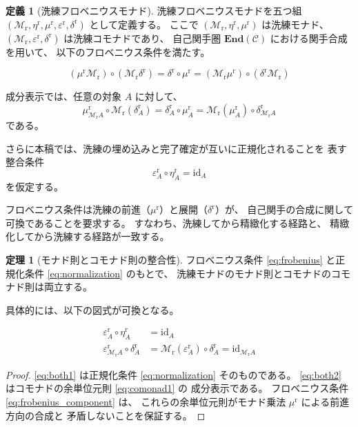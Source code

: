 \documentclass[11pt,a4paper]{article}
\theoremstyle{definition}
\newtheorem{definition}{定義}[section]
\newtheorem{theorem}{定理}[section]
\newcommand{\Mr}{\mathcal{M}_{\mathrm{r}}}
\newcommand{\etar}{\eta^{\mathrm{r}}}
\newcommand{\mur}{\mu^{\mathrm{r}}}
\newcommand{\epsr}{\varepsilon^{\mathrm{r}}}
\newcommand{\deltar}{\delta^{\mathrm{r}}}
\newcommand{\id}{\mathrm{id}}
\newcommand{\End}{\mathbf{End}}
\begin{document}
\begin{definition}[洗練フロベニウスモナド]
洗練フロベニウスモナドを五つ組
$(\Mr, \etar, \mur, \epsr, \deltar)$
として定義する。
ここで $(\Mr, \etar, \mur)$ は洗練モナド、
$(\Mr, \epsr, \deltar)$ は洗練コモナドであり、
自己関手圏 $\End(\mathcal{C})$ における関手合成を用いて、
以下のフロベニウス条件を満たす。

\begin{equation}
(\mur\Mr) \circ (\Mr\deltar)
= \deltar \circ \mur
= (\Mr\mur) \circ (\deltar\Mr)
\label{eq:frobenius}
\end{equation}

成分表示では、任意の対象 $A$ に対して、
\begin{equation}
\mur_{\Mr A} \circ \Mr(\deltar_A)
= \deltar_A \circ \mur_A
= \Mr(\mur_A) \circ \deltar_{\Mr A}
\label{eq:frobenius_component}
\end{equation}
である。

さらに本稿では、洗練の埋め込みと完了確定が互いに正規化されることを
表す整合条件
\begin{equation}
\epsr_A \circ \etar_A = \id_A
\label{eq:normalization}
\end{equation}
を仮定する。

フロベニウス条件は洗練の前進（$\mur$）と展開（$\deltar$）が、
自己関手の合成に関して
可換であることを要求する。
すなわち、洗練してから精緻化する経路と、
精緻化してから洗練する経路が一致する。
\end{definition}

\begin{theorem}[モナド則とコモナド則の整合性]
フロベニウス条件 \eqref{eq:frobenius} と正規化条件
\eqref{eq:normalization} のもとで、
洗練モナドのモナド則とコモナドのコモナド則は両立する。

具体的には、以下の図式が可換となる。

\begin{align}
\epsr_A \circ \etar_A &= \id_A \label{eq:both1}\\
\epsr_{\Mr A} \circ \deltar_A
&= \Mr(\epsr_A) \circ \deltar_A
= \id_{\Mr A}
\label{eq:both2}
\end{align}
\end{theorem}

\begin{proof}
\eqref{eq:both1} は正規化条件 \eqref{eq:normalization} そのものである。
\eqref{eq:both2} はコモナドの余単位元則 \eqref{eq:comonad1} の
成分表示である。
フロベニウス条件 \eqref{eq:frobenius_component} は、
これらの余単位元則がモナド乗法 $\mur$ による前進方向の合成と
矛盾しないことを保証する。
\end{proof}
\end{document}
